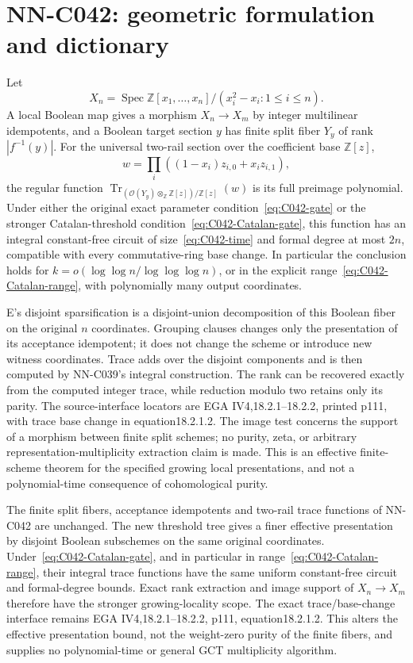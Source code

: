 \section{NN-C042: geometric formulation and dictionary}
\begin{geometricstatement}[NN-C042]
Let
\[
 X_n=\operatorname{Spec}
       \mathbb Z[x_1,\ldots,x_n]/(x_i^2-x_i:1\le i\le n).
\]
A local Boolean map gives a morphism $X_n\to X_m$ by integer multilinear idempotents, and a Boolean target section $y$ has finite split fiber $Y_y$ of rank $|f^{-1}(y)|$. For the universal two-rail section over the coefficient base $\mathbb Z[z]$,
\[
            w=\prod_i((1-x_i)z_{i,0}+x_i z_{i,1}),
\]
the regular function
$\operatorname{Tr}_{(\mathcal O(Y_y)\otimes_{\mathbb Z}\mathbb Z[z])/\mathbb Z[z]}(w)$ is its full preimage polynomial. Under either the original exact parameter condition~\eqref{eq:C042-gate} or the stronger Catalan-threshold condition~\eqref{eq:C042-Catalan-gate}, this function has an integral constant-free circuit of size~\eqref{eq:C042-time} and formal degree at most $2n$, compatible with every commutative-ring base change. In particular the conclusion holds for $k=o(\log\log n/\log\log\log n)$, or in the explicit range~\eqref{eq:C042-Catalan-range}, with polynomially many output coordinates.

E's disjoint sparsification is a disjoint-union decomposition of this Boolean fiber on the original $n$ coordinates. Grouping clauses changes only the presentation of its acceptance idempotent; it does not change the scheme or introduce new witness coordinates. Trace adds over the disjoint components and is then computed by NN-C039's integral construction. The rank can be recovered exactly from the computed integer trace, while reduction modulo two retains only its parity. The source-interface locators are EGA IV4,18.2.1--18.2.2, printed p111, with trace base change in equation18.2.1.2. The image test concerns the support of a morphism between finite split schemes; no purity, zeta, or arbitrary representation-multiplicity extraction claim is made. This is an effective finite-scheme theorem for the specified growing local presentations, and not a polynomial-time consequence of cohomological purity.


The finite split fibers, acceptance idempotents and two-rail trace
functions of NN-C042 are unchanged. The new threshold tree gives a
finer effective presentation by disjoint Boolean subschemes on the
same original coordinates. Under~\eqref{eq:C042-Catalan-gate}, and
in particular in range~\eqref{eq:C042-Catalan-range}, their integral
trace functions have the same uniform constant-free circuit and
formal-degree bounds. Exact rank extraction and image support of
$X_n\to X_m$ therefore have the stronger growing-locality scope.
The exact trace/base-change interface remains EGA IV4,18.2.1--18.2.2,
p111, equation18.2.1.2. This alters the effective presentation bound,
not the weight-zero purity of the finite fibers, and supplies no
polynomial-time or general GCT multiplicity algorithm.

\end{geometricstatement}
